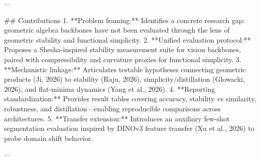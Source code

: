 ---

## Contributions  
1. **Problem framing:** Identifies a concrete research gap: geometric algebra backbones have not been evaluated through the lens of geometric stability and functional simplicity.  
2. **Unified evaluation protocol:** Proposes a Shesha-inspired stability measurement suite for vision backbones, paired with compressibility and curvature proxies for functional simplicity.  
3. **Mechanistic linkage:** Articulates testable hypotheses connecting geometric products (Ji, 2026) to stability (Raju, 2026), simplicity/distillation (Glowacki, 2026), and flat-minima dynamics (Yang et al., 2026).  
4. **Reporting standardization:** Provides result tables covering accuracy, stability vs similarity, robustness, and distillation—enabling reproducible comparisons across architectures.  
5. **Transfer extension:** Introduces an auxiliary few-shot segmentation evaluation inspired by DINOv3 feature transfer (Xu et al., 2026) to probe domain shift behavior.

---